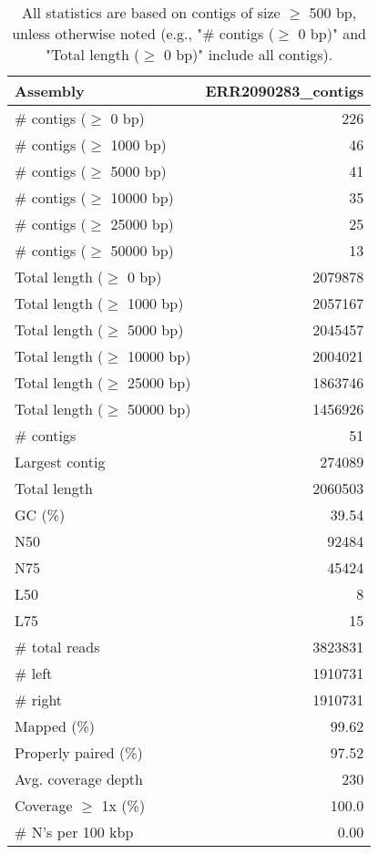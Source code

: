 \documentclass[12pt,a4paper]{article}
\begin{document}
\begin{table}[ht]
\begin{center}
\caption{All statistics are based on contigs of size $\geq$ 500 bp, unless otherwise noted (e.g., "\# contigs ($\geq$ 0 bp)" and "Total length ($\geq$ 0 bp)" include all contigs).}
\begin{tabular}{|l*{1}{|r}|}
\hline
Assembly & ERR2090283\_contigs \\ \hline
\# contigs ($\geq$ 0 bp) & 226 \\ \hline
\# contigs ($\geq$ 1000 bp) & 46 \\ \hline
\# contigs ($\geq$ 5000 bp) & 41 \\ \hline
\# contigs ($\geq$ 10000 bp) & 35 \\ \hline
\# contigs ($\geq$ 25000 bp) & 25 \\ \hline
\# contigs ($\geq$ 50000 bp) & 13 \\ \hline
Total length ($\geq$ 0 bp) & 2079878 \\ \hline
Total length ($\geq$ 1000 bp) & 2057167 \\ \hline
Total length ($\geq$ 5000 bp) & 2045457 \\ \hline
Total length ($\geq$ 10000 bp) & 2004021 \\ \hline
Total length ($\geq$ 25000 bp) & 1863746 \\ \hline
Total length ($\geq$ 50000 bp) & 1456926 \\ \hline
\# contigs & 51 \\ \hline
Largest contig & 274089 \\ \hline
Total length & 2060503 \\ \hline
GC (\%) & 39.54 \\ \hline
N50 & 92484 \\ \hline
N75 & 45424 \\ \hline
L50 & 8 \\ \hline
L75 & 15 \\ \hline
\# total reads & 3823831 \\ \hline
\# left & 1910731 \\ \hline
\# right & 1910731 \\ \hline
Mapped (\%) & 99.62 \\ \hline
Properly paired (\%) & 97.52 \\ \hline
Avg. coverage depth & 230 \\ \hline
Coverage $\geq$ 1x (\%) & 100.0 \\ \hline
\# N's per 100 kbp & 0.00 \\ \hline
\end{tabular}
\end{center}
\end{table}
\end{document}
